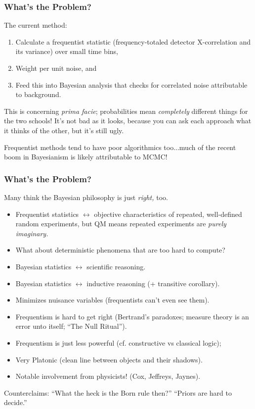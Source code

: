 \documentclass[10pt]{beamer}
\begin{document}
\begin{frame}
  \frametitle{What's the Problem?}
  The current method:
  \begin{enumerate}
  \item Calculate a frequentist statistic (frequency-totaled detector X-correlation and its variance) over small time bins,
  \item Weight per unit noise, and
  \item Feed this into Bayesian analysis that checks for correlated noise attributable to background.
  \end{enumerate}
  This is concerning \textit{prima facie}; probabilities mean \textit{completely} different things for the two schools!
  It's not bad as it looks, because you can ask each approach what it thinks of the other, but it's still ugly.

  Frequentist methods tend to have poor algorithmics too...much of the recent boom in Bayesianism is likely attributable to MCMC!
\end{frame}

\begin{frame}
  \frametitle{What's the Problem?}
  Many think the Bayesian philosophy is just \textit{right,} too.
  \begin{itemize}
  \item Frequentist statistics $\longleftrightarrow$ objective characteristics of repeated, well-defined random experiments,
    but QM means repeated experiments are \textit{purely imaginary.}
  \item What about deterministic phenomena that are too hard to compute?
  \item Bayesian statistics $\longleftrightarrow$ scientific reasoning.
  \item Bayesian statistics $\longleftrightarrow$ inductive reasoning (+ transitive corollary).
  \item Minimizes nuisance variables (frequentists can't even see them).
  \item Frequentism is hard to get right (Bertrand's paradoxes; measure theory is an error unto itself; ``The Null Ritual'').
  \item Frequentism is just less powerful (cf. constructive vs classical logic);
  \item Very Platonic (clean line between objects and their shadows).
  \item Notable involvement from physicists! (Cox, Jeffreys, Jaynes).
  \end{itemize}
  Counterclaims: ``What the heck is the Born rule then?'' ``Priors are hard to decide.''
\end{frame}
\end{document}
